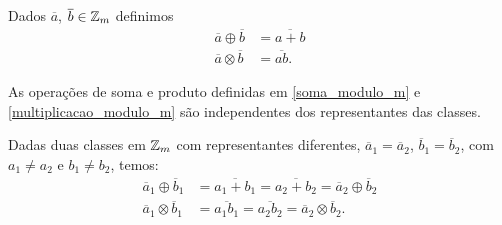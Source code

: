 \documentclass{beamer}
\begin{document}
    \begin{frame}
        \begin{definicao}
            Dados $\overline{a}$, $\overline{b} \in \mathbb{Z}_m$ definimos
            \begin{align}
                \overline{a}\oplus\overline{b} &= \overline{a + b}\label{soma_modulo_m}\\
                \overline{a}\otimes\overline{b} &= \overline{ab}.\label{multiplicacao_modulo_m}
            \end{align}
        \end{definicao}

        \begin{proposicao}
            As opera{\c c}{\~o}es de soma e produto definidas em \eqref{soma_modulo_m} e \eqref{multiplicacao_modulo_m} s{\~a}o independentes dos representantes das classes.
        \end{proposicao}
        \begin{prova}
            Dadas duas classes em $\mathbb{Z}_m$ com representantes diferentes, $\overline{a}_{1} = \overline{a}_{2}$, $\overline{b}_{1} = \overline{b}_{2}$, com $a_{1}\ne a_{2}$ e $b_{1}\ne b_{2}$, temos:
            \begin{align*}
                \overline{a}_{1}\oplus \overline{b}_{1} &= \overline{a_{1}+b_{1}} = \overline{a_{2} + b_{2}} =  \overline{a}_{2}\oplus \overline{b}_{2}\\
                \overline{a}_{1}\otimes \overline{b}_{1} &= \overline{a_{1}b_{1}} = \overline{a_{2}b_{2}} = \overline{a}_{2}\otimes\overline{b}_{2}.
            \end{align*}
        \end{prova}
    \end{frame}
\end{document}
